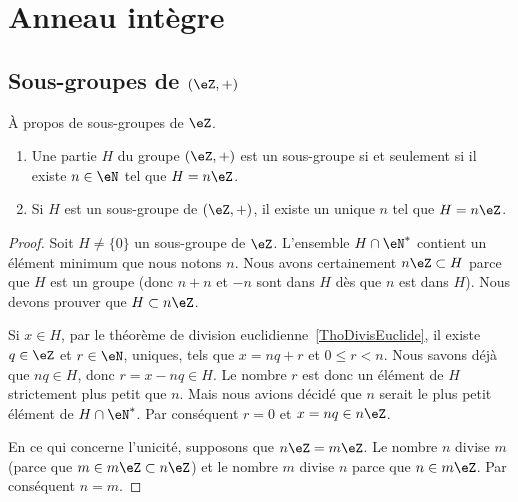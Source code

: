 \section{Anneau intègre}
\label{SECAnneauxIntegres}

\subsection{Sous-groupes de \texorpdfstring{\( (\eZ,+)\)}{(Z,+)}}

\begin{proposition} \label{PropSsgpZestnZ}
	À propos de sous-groupes de \( \eZ\).
	\begin{enumerate}
		\item
		      Une partie \( H\) du groupe \( (\eZ,+)\) est un sous-groupe si et seulement si il existe \( n\in\eN\) tel que \( H=n\eZ\).
		\item       \label{ITEMooOWNZooUsYRok}
		      Si \( H\) est un sous-groupe de \( (\eZ,+)\), il existe un unique \( n\) tel que \( H=n\eZ\).
	\end{enumerate}
\end{proposition}

\begin{proof}
	Soit \( H\neq\{ 0 \}\) un sous-groupe de \( \eZ\). L'ensemble \( H\cap\eN^*\) contient un élément minimum que nous notons \( n\). Nous avons certainement \( n\eZ\subset H\) parce que \( H\) est un groupe (donc \( n+n\) et \( -n\) sont dans \( H\) dès que \( n\) est dans \( H\)). Nous devons prouver que \( H\subset n\eZ\).

	Si \( x\in H\), par le théorème de division euclidienne~\ref{ThoDivisEuclide}, il existe \( q\in\eZ\) et \( r\in\eN \), uniques, tels que \( x=nq+r\) et \(0 \leq r < n \). Nous savons déjà que \( nq\in H\), donc \( r = x - nq \in H \). Le nombre \( r\) est donc un élément de \( H\) strictement plus petit que \( n\). Mais nous avions décidé que \( n\) serait le plus petit élément de \( H\cap\eN^*\). Par conséquent \( r=0\) et \( x=nq\in n\eZ\).


	En ce qui concerne l'unicité, supposons que \( n\eZ=m\eZ\). Le nombre \( n\) divise \( m\) (parce que \( m\in m\eZ\subset n\eZ\)) et le nombre \( m\) divise \( n\) parce que \( n\in m\eZ\). Par conséquent \( n=m\).
\end{proof}



